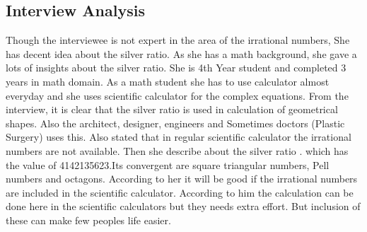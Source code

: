 \subsection{Interview  Analysis}
Though the interviewee is not expert in the area of the irrational numbers, She has decent idea about the silver ratio. As she has a math background, she gave a lots of insights about the silver ratio. She is 4th Year student and completed 3 years in math domain. As a math student she has to use calculator almost everyday and she uses scientific calculator for the complex equations. From the interview, it is clear that the silver ratio is used in calculation of geometrical shapes. Also the architect, designer, engineers and Sometimes doctors (Plastic Surgery) uses this. Also stated that in regular scientific calculator the irrational numbers are not available. Then she describe about the silver ratio . which has the value of 4142135623.Its convergent are square triangular numbers, Pell numbers and octagons. According to her it will be good if the irrational numbers are included in the scientific calculator. According to him the calculation can be done here in the scientific calculators but they needs extra effort. But inclusion of these can make few peoples life easier. 